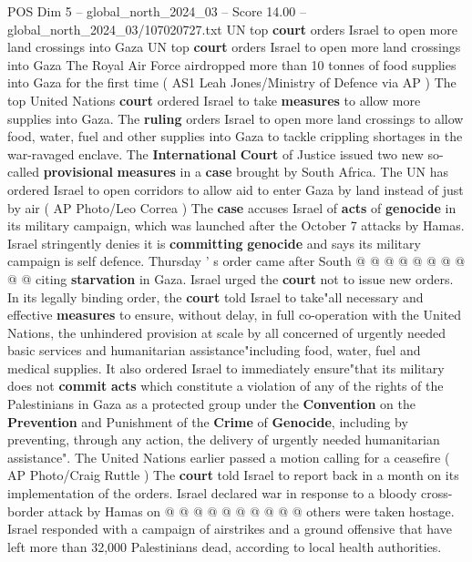 \begin{textsample}{POS Dim 5 – global\_north\_2024\_03 – Score 14.00 – global\_north\_2024\_03/107020727.txt}  \label{ex:f5_pos_369}
UN top \textbf{court} orders Israel to open more land crossings into Gaza UN top \textbf{court} orders Israel to open more land crossings into Gaza The Royal Air Force airdropped more than 10 tonnes of food supplies into Gaza for the first time ( AS1 Leah Jones/Ministry of Defence via AP ) The top United Nations \textbf{court} ordered Israel to take \textbf{measures} to allow more supplies into Gaza.
The \textbf{ruling} orders Israel to open more land crossings to allow food, water, fuel and other supplies into Gaza to tackle crippling shortages in the war-ravaged enclave.
The \textbf{International} \textbf{Court} of Justice issued two new so-called \textbf{provisional} \textbf{measures} in a \textbf{case} brought by South Africa.
The UN has ordered Israel to open corridors to allow aid to enter Gaza by land instead of just by air ( AP Photo/Leo Correa ) The \textbf{case} accuses Israel of \textbf{acts} of \textbf{genocide} in its military campaign, which was launched after the October 7 attacks by Hamas.
Israel stringently denies it is \textbf{committing} \textbf{genocide} and says its military campaign is self defence.
Thursday ' s order came after South @ @ @ @ @ @ @ @ @ @ citing \textbf{starvation} in Gaza.
Israel urged the \textbf{court} not to issue new orders.
In its legally binding order, the \textbf{court} told Israel to take"all necessary and effective \textbf{measures} to ensure, without delay, in full co-operation with the United Nations, the unhindered provision at scale by all concerned of urgently needed basic services and humanitarian assistance"including food, water, fuel and medical supplies.
It also ordered Israel to immediately ensure"that its military does not \textbf{commit} \textbf{acts} which constitute a violation of any of the rights of the Palestinians in Gaza as a protected group under the \textbf{Convention} on the \textbf{Prevention} and Punishment of the \textbf{Crime} of \textbf{Genocide}, including by preventing, through any action, the delivery of urgently needed humanitarian assistance".
The United Nations earlier passed a motion calling for a ceasefire ( AP Photo/Craig Ruttle ) The \textbf{court} told Israel to report back in a month on its implementation of the orders.
Israel declared war in response to a bloody cross-border attack by Hamas on @ @ @ @ @ @ @ @ @ @ others were taken hostage.
Israel responded with a campaign of airstrikes and a ground offensive that have left more than 32,000 Palestinians dead, according to local health authorities.

\end{textsample}
